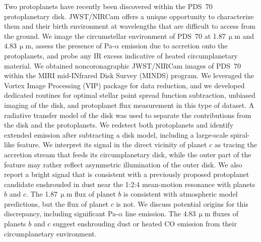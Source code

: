 \documentclass[longauth]{aa}
\newcommand{\vc}[1]{#1}
\newcommand{\new}[1]{#1}
\begin{document}
    \abstract
    {Two protoplanets have recently been discovered within the PDS~70 protoplanetary \new{disk}. %
    JWST/NIRCam offers a unique opportunity to characterize them and their birth environment at wavelengths that are difficult to access from the ground.}
    {We image the circumstellar environment of PDS~70 %
    at 1.87\,$\upmu$m and 4.83\,$\upmu$m, assess the presence of Pa-$\alpha$ emission due to accretion onto the protoplanets, and probe any IR excess indicative of heated circumplanetary material.}
    {We obtained noncoronagraphic JWST/NIRCam images of PDS~70 within the MIRI mid-INfrared Disk Survey (MINDS) program. We leveraged the Vortex Image Processing (VIP) package for data reduction, and we developed dedicated routines for optimal stellar point spread function subtraction, unbiased imaging of the disk, and protoplanet flux measurement in this type of dataset. %
    A radiative transfer model of the disk was used to separate the %
    contributions from the disk and the protoplanets.}
    {We redetect both protoplanets
    and identify extended emission after subtracting a %
    disk model, \vc{including} a large-scale spiral-like feature. We interpret its signal in the direct vicinity of planet $c$ as tracing the accretion stream that feeds its circumplanetary disk, while the outer part of the feature may rather reflect asymmetric illumination %
    of the outer disk. %
    We also report a bright signal that is consistent with a previously proposed protoplanet candidate enshrouded in dust \vc{near} the 1:2:4 mean-motion resonance with planets $b$ and $c$. %
    The 1.87\,$\upmu$m flux of planet $b$ is consistent with atmospheric model predictions, %
    but the flux of planet $c$ is not. We discuss potential origins for this discrepancy, including %
    significant Pa-$\alpha$ line emission.     
    The 4.83\,$\upmu$m fluxes of planets $b$ and $c$ %
    suggest %
    enshrouding dust or heated CO emission from their circumplanetary environment. %
    }
\end{document}
